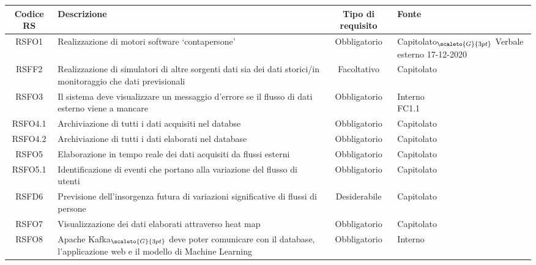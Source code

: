 \def\tabularxcolumn#1{m{#1}}
{
	
	\begin{center}
		\renewcommand{\arraystretch}{1.4}
		\begin{tabularx}{\textwidth}{ |c|X|c|X| }
			\hline
			\rowcolor{Melon}
			\textbf{Codice RS} & \textbf{Descrizione} & \textbf{Tipo di requisito} & \textbf{Fonte} \\
			\hline
			RSFO1 & Realizzazione di motori software ‘contapersone’  & Obbligatorio & \makecell[tcX]{Capitolato$_{\scaleto{G}{3pt}}$ \\ Verbale esterno 17-12-2020} \\
			\hline
			RSFF2 & Realizzazione di simulatori di altre sorgenti dati sia dei dati storici/in monitoraggio che dati previsionali & Facoltativo & Capitolato \\
			\hline
			RSFO3  & Il sistema deve visualizzare un messaggio d'errore se il flusso di dati esterno viene a mancare  & Obbligatorio & \makecell[tcX]{Interno\\FC1.1}  \\
			\hline
			RSFO4.1 & Archiviazione di tutti i dati acquisiti nel databse & Obbligatorio & Capitolato  \\
				\hline
				RSFO4.2 & Archiviazione di tutti i dati elaborati nel database & Obbligatorio & Capitolato  \\

			\hline
			RSFO5 & Elaborazione in tempo reale dei dati acquisiti da flussi esterni & Obbligatorio & Capitolato  \\
			\hline
			RSFO5.1 & Identificazione di eventi che portano alla variazione del flusso di utenti & Obbligatorio & Capitolato  \\
			\hline
			RSFD6 & Previsione dell'insorgenza futura di variazioni significative di flussi di persone & Desiderabile & Capitolato  \\
			\hline
			RSFO7 & Visualizzazione dei dati elaborati attraverso heat map & Obbligatorio & Capitolato  \\
		\hline
			RSFO8 & Apache Kafka$_{\scaleto{G}{3pt}}$ deve poter comunicare con il database, l'applicazione web e il modello di Machine Learning  & Obbligatorio &  Interno \\		
			\hline
	\end{tabularx}
	\end{center}

}
